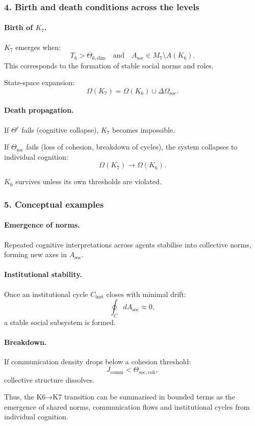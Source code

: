 \subsubsection{4. Birth and death conditions across the levels}

\paragraph{Birth of \texorpdfstring{$K_7$}{K_7}.}
$K_7$ emerges when:
\[
T_6 > \Theta_{6,\mathrm{dim}}
\quad\text{and}\quad
A_{\mathrm{soc}} \in M_7 \setminus A(K_6).
\]
This corresponds to the formation of stable social norms and roles.

State-space expansion:
\[
\Omega(K_7) = \Omega(K_6) \cup \Delta\Omega_{\mathrm{soc}}.
\]

\paragraph{Death propagation.}
If $\Theta^{c}$ fails (cognitive collapse), $K_7$ becomes impossible.

If $\Theta_{\mathrm{soc}}$ fails (loss of cohesion, breakdown of cycles),
the system collapses to individual cognition:
\[
\Omega(K_7) \rightarrow \Omega(K_6).
\]

$K_6$ survives unless its own thresholds are violated.

\subsubsection{5. Conceptual examples}

\paragraph{Emergence of norms.}
Repeated cognitive interpretations across agents stabilise into collective
norms, forming new axes in $A_{\mathrm{soc}}$.

\paragraph{Institutional stability.}
Once an institutional cycle $C_{\mathrm{inst}}$ closes with minimal drift:
\[
\oint_C dA_{\mathrm{soc}} \approx 0,
\]
a stable social subsystem is formed.

\paragraph{Breakdown.}
If communication density drops below a cohesion threshold:
\[
J_{\mathrm{comm}} < \Theta_{\mathrm{soc,coh}},
\]
collective structure dissolves.

Thus, the K6→K7 transition can be summarised in bounded terms as the
emergence of shared norms, communication flows and institutional cycles
from individual cognition.

